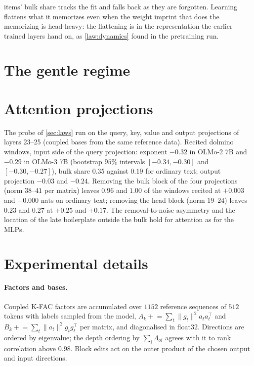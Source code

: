 \documentclass{article}
\theoremstyle{definition}\newtheorem{law}{Empirical law}
\begin{document}
items' bulk share tracks the fit and falls back as they are forgotten. Learning flattens what it memorizes even when the weight imprint that does the memorizing is head-heavy: the flattening is in the representation the earlier trained layers hand on, as \cref{law:dynamics} found in the pretraining run. \regimeNote

\section{The gentle regime}\label{app:gentle}
\gentleSection

\section{Attention projections}\label{app:attention}
The probe of \cref{sec:laws} run on the query, key, value and output projections of layers 23--25 (coupled bases from the same reference data). Recited dolmino windows, input side of the query projection: exponent $-0.32$ in OLMo-2 7B and $-0.29$ in OLMo-3 7B (bootstrap $95\%$ intervals $[-0.34,-0.30]$ and $[-0.30,-0.27]$), bulk share $0.35$ against $0.19$ for ordinary text; output projection $-0.03$ and $-0.24$. Removing the bulk block of the four projections (norm $38$--$41$ per matrix) leaves $0.96$ and $1.00$ of the windows recited at $+0.003$ and $-0.000$ nats on ordinary text; removing the head block (norm $19$--$24$) leaves $0.23$ and $0.27$ at $+0.25$ and $+0.17$. The removal-to-noise asymmetry and the location of the late boilerplate outside the bulk hold for attention as for the MLPs.

\section{Experimental details}\label{app:details}

\paragraph{Factors and bases.} Coupled K-FAC factors are accumulated over $1152$ reference sequences of $512$ tokens with labels sampled from the model, $A_k\mathrel{+}=\sum_t\|g_t\|^2a_ta_t^\top$ and $B_k\mathrel{+}=\sum_t\|a_t\|^2g_tg_t^\top$ per matrix, and diagonalised in float32. Directions are ordered by eigenvalue; the depth ordering by $\sum_i\Lambda_{oi}$ agrees with it to rank correlation above $0.98$. Block edits act on the outer product of the chosen output and input directions.
\end{document}
